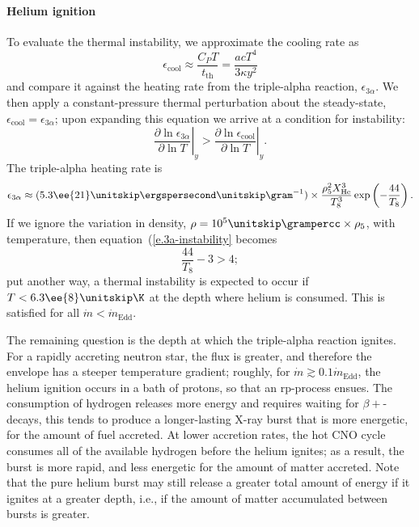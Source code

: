 \paragraph{Helium ignition}
To evaluate the thermal instability, we approximate the cooling rate as
\begin{equation}\label{e.cooling-rate-approx}
\epsilon_{\mathrm{cool}} \approx \frac{C_{P}T}{t_{\mathrm{th}}} = \frac{ac T^{4}}{3\kappa y^{2}}
\end{equation}
and compare it against the heating rate from the triple-alpha reaction, $\epsilon_{3\alpha}$. We then apply a constant-pressure thermal perturbation about the steady-state, $\epsilon_{\mathrm{cool}} = \epsilon_{3\alpha}$; upon expanding this equation we arrive at a condition for instability:
\begin{equation}\label{e.3a-instability}
\left.\frac{\partial\ln\epsilon_{3\alpha}}{\partial\ln T}\right|_{y} > \left.\frac{\partial\ln\epsilon_{\mathrm{cool}}}{\partial\ln T}\right|_{y}.
\end{equation}
The triple-alpha heating rate is 
\[
	\epsilon_{3\alpha} \approx (5.3\ee{21}\nsp\ergspersecond\usp\gram^{-1}) \times \frac{\rho_{5}^{2}X_{\mathrm{He}}^{3}}{T_{8}^{3}}\exp\left(-\frac{44}{T_{8}}\right).
\]
If we ignore the variation in density, $\rho = 10^{5}\nsp\grampercc \times \rho_{5}$, with temperature, then equation~(\ref{e.3a-instability} becomes
\begin{equation}\label{e.3a-instability-temperature}
\frac{44}{T_{8}} - 3 > 4;
\end{equation}
put another way, a thermal instability is expected to occur if $T < 6.3\ee{8}\nsp\K$ at the depth where helium is consumed.  This is satisfied for all $\dot{m}< \dot{m}_{\mathrm{Edd}}$.

The remaining question is the depth at which the triple-alpha reaction ignites.  For a rapidly accreting neutron star, the flux is greater, and therefore the envelope has a steeper temperature gradient\cite{bildsten:thermonuclear}; roughly, for $\dot{m} \gtrsim 0.1\dot{m}_{\mathrm{Edd}}$, the helium ignition occurs in a bath of protons, so that an rp-process ensues. The consumption of hydrogen releases more energy and requires waiting for $\beta+$-decays, this tends to produce a longer-lasting X-ray burst that is more energetic, for the amount of fuel accreted.    At lower accretion rates, the hot CNO cycle consumes all of the available hydrogen before the helium ignites; as a result, the burst is more rapid, and less energetic for the amount of matter accreted.  Note that the pure helium burst may still release a greater total amount of energy if it ignites at a greater depth, i.e., if the amount of matter accumulated between bursts is greater.
